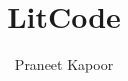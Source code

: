 \documentclass{article}
\begin{document}
\title{LitCode}
\author{Praneet Kapoor}
\maketitle



\newpage
\lstlistoflistings

\newpage
\printbibliography
\end{document}
